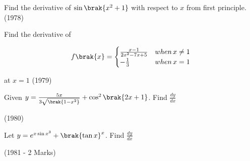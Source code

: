 \iffalse
  \title{Assignment}
  \author{AI24BTECH11022 - Pabbuleti Venkata Charan Teja}
  \section{subjective}
\fi


\item 
Find the derivative of $\sin\brak{x^{2}+1}$ with respect to $x$ from first principle. \hfill{(1978)}

\item 
Find the derivative of

\begin{equation*}
f\brak{x} =
\begin{cases}
\frac{x-1}{2x^{2}-7x+5} & when\,x\not=1\\

-\frac{1}{3} & when\,x=1\\
\end{cases}
\end{equation*}

at $x=1$ \hfill{(1979)}

\item 
Given $y=\frac{5x}{3\sqrt{\brak{1-x^{2}}}}+\cos^{2}\brak{2x+1}$. Find $\frac{dy}{dx}$

\hfill{(1980)}

\item 
Let $y=e^{x\sin x^{3}}+\brak{\tan x}^{x}$. Find $\frac{dy}{dx}$ 

\hfill{(1981 - 2 Marks)}

